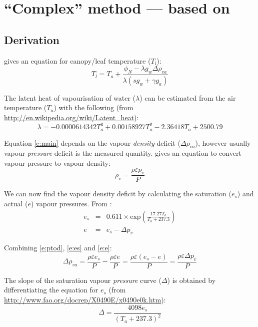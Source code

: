 \documentclass[a4paper]{article}
\begin{document}
\section{``Complex'' method --- based on \citet{thornley90}}


\subsection{Derivation}

\citet[p.~418]{thornley90} gives an equation for canopy/leaf temperature ($T_l$):
\begin{equation}
\label{e:main}
T_l =  T_a + \frac{\phi_N - \lambda g_w \Delta \rho_{va}}{\lambda \left(s g_w + \gamma g_a\right)}
\end{equation}

The latent heat of vapourisation of water ($\lambda$) can be estimated from the air temperature 
($T_a$) with the following (from \url{http://en.wikipedia.org/wiki/Latent_heat}):
\begin{equation}
\lambda = -0.0000614342 T_a^3 + 0.00158927 T_a^2 - 2.36418 T_a + 2500.79
\end{equation}

Equation \eqref{e:main} depends on the vapour \emph{density} deficit ($\Delta \rho_{va}$), however 
usually vapour \emph{pressure} deficit is the measured quantity.  \citet[p.~409]{thornley90} gives 
an equation to convert vapour pressure to vapour density:
\begin{equation}
\label{e:ptod}
\rho_v = \frac{\rho \varepsilon p_v}{P}
\end{equation}

We can now find the vapour density deficit by calculating the saturation ($e_s$) and actual ($e$) 
    vapour pressures.  From \citet[p.~10]{monteith90}:
\begin{eqnarray}
\label{e:es}
e_s & = & 0.611 \times \text{exp}\left(\frac{17.27 T_a}{T_a + 237.3}\right) \\
e & = & e_s - \Delta p_v
\end{eqnarray}

Combining \eqref{e:ptod}, \eqref{e:es} and \eqref{e:e}:
\begin{equation}
\label{e:e}
\Delta \rho_{va} = \frac{\rho \varepsilon e_s}{P} - \frac{\rho \varepsilon e}{P} = \frac{\rho 
    \varepsilon (e_s - e)}{P} = \frac{\rho \varepsilon \Delta p_v}{P}
\end{equation}

The slope of the saturation vapour \emph{pressure} curve ($\Delta$) is obtained by differentiating 
the equation for $e_s$ (from \url{http://www.fao.org/docrep/X0490E/x0490e0k.htm}):
\begin{equation}
\label{e:deltavp}
\Delta = \frac{4098 e_s}{(T_a + 237.3)^2}
\end{equation}
\end{document}
